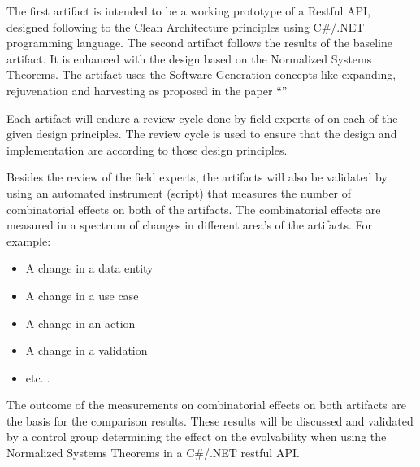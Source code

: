 The first artifact is intended to be a working prototype of a Restful API, designed
following to the Clean Architecture principles \parencite[]{martin_clean_2018} using
C\#/.NET programming language. The second artifact follows the results of the baseline
artifact. It is enhanced with the design based on the Normalized Systems Theorems. The
artifact uses the Software Generation concepts like expanding, rejuvenation and harvesting
as proposed in the paper \enquote{}
\parencite[]{mannaert_realization_2020}

Each artifact will endure a review cycle done by field experts of on each of the given
design principles. The review cycle is used to ensure that the design and implementation
are according to those design principles.

Besides the review of the field experts, the artifacts will also be validated by using an automated
instrument (script) that measures the number of combinatorial effects on both of the
artifacts. The combinatorial effects are measured in a spectrum of changes in different
area's of the artifacts. For example:
\begin{itemize}
    \item {A change in a data entity}
    \item {A change in a use case}
    \item {A change in an action}
    \item {A change in a validation}
    \item {etc...}
\end{itemize}

The outcome of the measurements on combinatorial effects on both artifacts are the basis
for the comparison results. These results will be discussed and validated by a control
group determining the effect on the evolvability when using the Normalized Systems
Theorems in a C\#/.NET restful API. 
